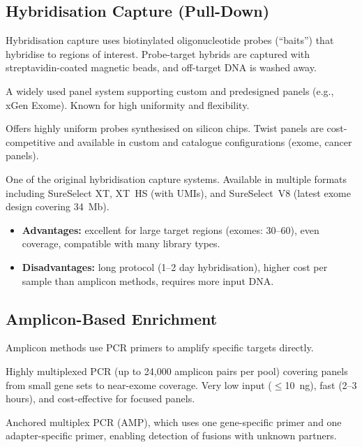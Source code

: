 \subsection{Hybridisation Capture (Pull-Down)}

Hybridisation capture uses biotinylated oligonucleotide probes (``baits'') that hybridise to regions of interest. Probe-target hybrids are captured with streptavidin-coated magnetic beads, and off-target DNA is washed away.

\begin{description}[style=nextline, font=\bfseries]
  \item[IDT xGen Lockdown Probes] A widely used panel system supporting custom and predesigned panels (e.g., xGen Exome). Known for high uniformity and flexibility.

  \item[Twist Bioscience] Offers highly uniform probes synthesised on silicon chips. Twist panels are cost-competitive and available in custom and catalogue configurations (exome, cancer panels).

  \item[Agilent SureSelect] One of the original hybridisation capture systems. Available in multiple formats including SureSelect XT, XT~HS (with UMIs), and SureSelect~V8 (latest exome design covering 34~Mb).
\end{description}

\begin{itemize}[nosep]
  \item \textbf{Advantages:} excellent for large target regions (exomes: 30--60\megabase), even coverage, compatible with many library types.
  \item \textbf{Disadvantages:} long protocol (1--2 day hybridisation), higher cost per sample than amplicon methods, requires more input DNA.
\end{itemize}

\subsection{Amplicon-Based Enrichment}

Amplicon methods use PCR primers to amplify specific targets directly.

\begin{description}[style=nextline, font=\bfseries]
  \item[AmpliSeq (Thermo Fisher / Illumina)] Highly multiplexed PCR (up to 24{,}000 amplicon pairs per pool) covering panels from small gene sets to near-exome coverage. Very low input ($\leq$10~ng), fast (2--3 hours), and cost-effective for focused panels.

  \item[Archer FusionPlex / ArcherDX] Anchored multiplex PCR (AMP), which uses one gene-specific primer and one adapter-specific primer, enabling detection of fusions with unknown partners.
\end{description}

